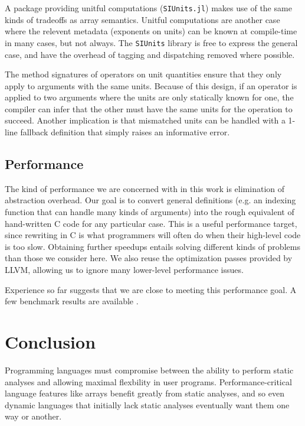 \documentclass{sigplanconf}
\newcommand{\code}[1]{\texttt{#1}}
\begin{document}
A package providing unitful computations (\code{SIUnits.jl}\cite{Fischer:2014si})
makes use of the same kinds of
tradeoffs as array semantics. Unitful computations are another case
where the relevent metadata (exponents on units) can be
known at compile-time in many cases, but not always. The
\code{SIUnits} library is free to express the general case, and have the
overhead of tagging and dispatching removed where possible.

The method signatures of operators on unit quantities ensure that they only
apply to arguments with the same units. Because of this design, if an
operator is applied to two arguments where the units are only statically
known for one, the compiler can infer that the other must have the same units
for the operation to succeed. Another implication is that mismatched units can
be handled with a 1-line fallback definition that simply raises an
informative error.


\subsection{Performance}

The kind of performance we are concerned with in this work is elimination of
abstraction overhead. Our goal is to convert general definitions (e.g. an
indexing function that can handle many kinds of arguments) into the rough
equivalent of hand-written C code for any particular case. This is a useful
performance target, since rewriting in C is what programmers will often do
when their high-level code is too slow. Obtaining further speedups entails
solving different kinds of problems than those we consider here. We also
reuse the optimization passes provided by LLVM\cite{LLVM}, allowing us to
ignore many lower-level performance issues.

Experience so far suggests that we are close to meeting this
performance goal. A few benchmark results are available
\cite{Bezanson:2012jf}.


\section{Conclusion}

Programming languages must compromise between the ability to perform
static analyses and allowing maximal flexbility in user programs.
Performance-critical language features like arrays benefit greatly from
static analyses, and so even dynamic languages that initially lack static
analyses eventually want them one way or another.
\end{document}
